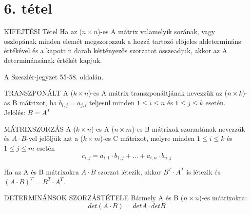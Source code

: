 \section{6. tétel}

\begin{tetel}{KIFEJTÉSI Tétel}
Ha az ($n \times n$)-es A mátrix valamelyik sorának, vagy oszlopának minden elemét megszorozzuk a hozzá tartozó előjeles aldetermináns értékével és a kapott n darab kéttényezős szorzatot összeadjuk, akkor az A determinánsának értékét kapjuk.
\end{tetel}

\begin{bizonyitas}{}
A Szeszlér-jegyzet 55-58. oldalán.
\end{bizonyitas}



\begin{definicio}{TRANSZPONÁLT}
A ($k\times n$)-es A mátrix transzponáltjának nevezzük az ($n\times k$)-as B mátrixot, ha $b_{i,j} = a_{j,i}$ teljesül minden $1 \leq i \leq n$ és $1 \leq j \leq k$ esetén.\\
Jelölés: $B = A^T$
\end{definicio}

\begin{definicio}{MÁTRIXSZORZÁS}
A ($k\times n$)-es A ($n\times m$)-es B mátrixok szorzatának nevezzük és $A\cdot B$-vel jelöljük azt a ($k\times m$)-es C mátrixot, melyre minden $1 \leq i \leq k$ és $1 \leq j \leq m$ esetén
$$c_{i,j} = a_{i,1}\cdot b_{1, j}+\ldots+a_{i,n}\cdot b_{n,j}$$
\end{definicio}

Ha az A és B mátrixokra $A \cdot B$ szorzat létezik, akkor $B^T \cdot A^T$ is létezik és $(A\cdot B)^T = B^T \cdot A^T$.

\begin{tetel}{DETERMINÁNSOK SZORZÁSTÉTELE}
Bármely A és B ($n\times n$)-es mátrixokra: $$det(A\cdot B)=detA \cdot detB$$
\end{tetel}

